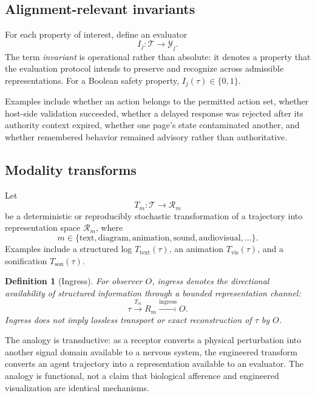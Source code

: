 \documentclass[11pt]{article}
\newtheorem{definition}{Definition}
\newcommand{\T}{\mathcal{T}}
\newcommand{\R}{\mathcal{R}}
\begin{document}
\subsection{Alignment-relevant invariants}
For each property of interest, define an evaluator
\begin{equation}
I_j:\T\rightarrow\mathcal{Y}_j.
\end{equation}
The term \emph{invariant} is operational rather than absolute: it denotes a property that the evaluation protocol intends to preserve and recognize across admissible representations. For a Boolean safety property, $I_j(\tau)\in\{0,1\}$.

Examples include whether an action belongs to the permitted action set, whether host-side validation succeeded, whether a delayed response was rejected after its authority context expired, whether one page's state contaminated another, and whether remembered behavior remained advisory rather than authoritative.

\subsection{Modality transforms}
Let
\begin{equation}
T_m:\T\rightarrow\R_m
\end{equation}
be a deterministic or reproducibly stochastic transformation of a trajectory into representation space $\R_m$, where
\begin{equation}
m\in\{\text{text},\text{diagram},\text{animation},\text{sound},\text{audiovisual},\ldots\}.
\end{equation}
Examples include a structured log $T_{\mathrm{text}}(\tau)$, an animation $T_{\mathrm{vis}}(\tau)$, and a sonification $T_{\mathrm{son}}(\tau)$.

\begin{definition}[Ingress]
For observer $O$, \emph{ingress} denotes the directional availability of structured information through a bounded representation channel:
\begin{equation}
\tau\xrightarrow{T_m}R_m\xrightarrow{\mathrm{ingress}}O.
\end{equation}
Ingress does not imply lossless transport or exact reconstruction of $\tau$ by $O$.
\end{definition}

The analogy is transductive: as a receptor converts a physical perturbation into another signal domain available to a nervous system, the engineered transform converts an agent trajectory into a representation available to an evaluator. The analogy is functional, not a claim that biological afference and engineered visualization are identical mechanisms.
\end{document}
